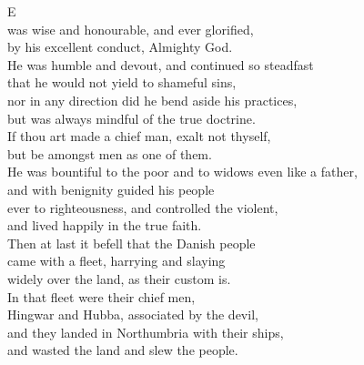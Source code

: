 \documentclass[10pt]{book}
\begin{document}
\vspace{0.2cm}

\begin{center}
\parbox{8.89cm}{
\lettrine[lines=4]{\color{BrickRed}E}{} \\
was wise and honourable, and ever glorified, \\
by his excellent conduct, Almighty God. \\
He was humble and devout, and continued so steadfast \\
that he would not yield to shameful sins, \\
nor in any direction did he bend aside his practices,\\
but was always mindful of the true doctrine. \\ 
If thou art made a chief man, exalt not thyself, \\
but be amongst men as one of them. \\
He was bountiful to the poor and to widows even like a father, \\
and with benignity guided his people \\
ever to righteousness, and controlled the violent,  \\
and lived happily in the true faith. \\
Then at last it befell that the Danish people \\
came with a fleet, harrying and slaying \\
widely over the land, as their custom is.  \\
In that fleet were their chief men, \\
Hingwar and Hubba, associated by the devil, \\
and they landed in Northumbria with their ships, \\
and wasted the land and slew the people. \\
}
\end{center}

\clearpage


\newlength\pagelen
\settowidth{}
\end{document}
